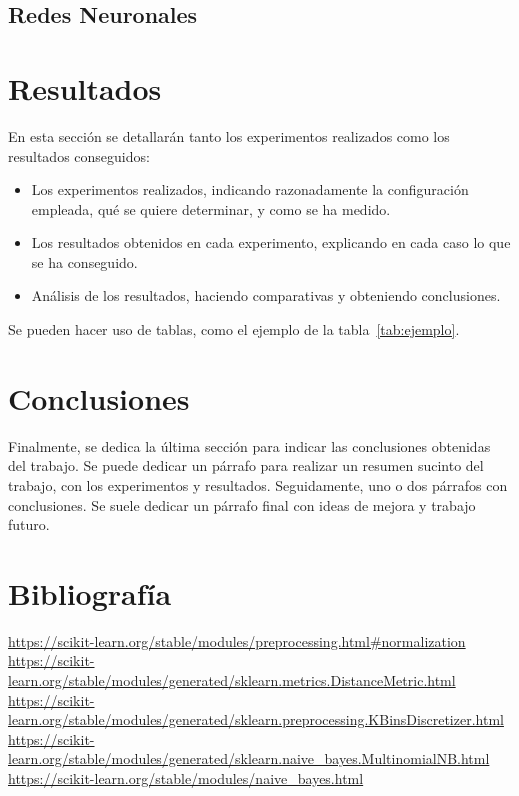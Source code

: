 \documentclass[conference,a4paper]{IEEEtran}
\begin{document}
\subsection{Redes Neuronales}


\section{Resultados}

En esta sección se detallarán tanto los experimentos realizados como los
resultados conseguidos:
\begin{itemize}
\item Los experimentos realizados, indicando razonadamente la configuración
  empleada, qué se quiere determinar, y como se ha medido.
\item Los resultados obtenidos en cada experimento, explicando en cada caso lo
  que se ha conseguido.
\item Análisis de los resultados, haciendo comparativas y obteniendo
  conclusiones.
\end{itemize}

Se pueden hacer uso de tablas, como el ejemplo de la tabla~\ref{tab:ejemplo}.




\section{Conclusiones}

Finalmente, se dedica la última sección para indicar las conclusiones obtenidas
del trabajo. Se puede dedicar un párrafo para realizar un resumen sucinto del
trabajo, con los experimentos y resultados. Seguidamente, uno o dos párrafos
con conclusiones. Se suele dedicar un párrafo final con ideas de mejora y
trabajo futuro.


\section{Bibliografía}
\begin{thebibliography}{00}
 \url{https://scikit-learn.org/stable/modules/preprocessing.html#normalization}
 \url{https://scikit-learn.org/stable/modules/generated/sklearn.metrics.DistanceMetric.html}
 \url{https://scikit-learn.org/stable/modules/generated/sklearn.preprocessing.KBinsDiscretizer.html}
 \url{https://scikit-learn.org/stable/modules/generated/sklearn.naive_bayes.MultinomialNB.html}
 \url{https://scikit-learn.org/stable/modules/naive_bayes.html}
\end{thebibliography}
\end{document}
